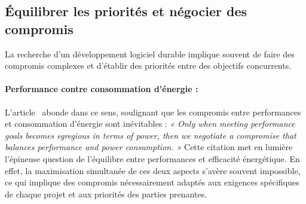 
\subsection{Équilibrer les priorités et négocier des compromis}

La recherche d'un développement logiciel durable implique souvent de faire des compromis complexes et d'établir des priorités entre des objectifs concurrents.

\paragraph{Performance contre consommation d'énergie :}
L'article~\cite{EmpiricalStudy} abonde dans ce sens, soulignant que les compromis entre performances et consommation d'énergie sont inévitables : \emph{« Only when meeting performance goals becomes egregious in terms of power, then we negotiate a compromise that balances performance and power consumption. »} Cette citation met en lumière l'épineuse question de l'équilibre entre performances et efficacité énergétique. En effet, la maximisation simultanée de ces deux aspects s'avère souvent impossible, ce qui implique des compromis nécessairement adaptés aux exigences spécifiques de chaque projet et aux priorités des parties prenantes.

